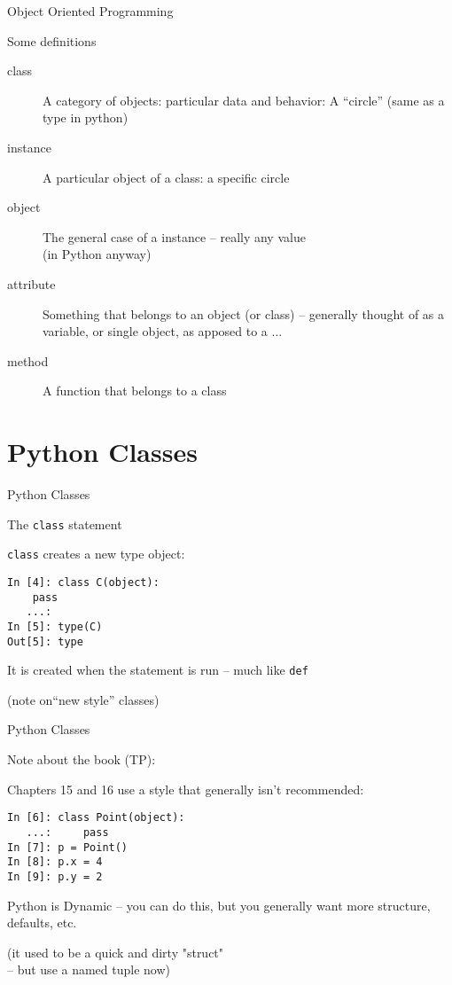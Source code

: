 \documentclass{beamer}
\begin{document}
\begin{frame}[fragile]{Object Oriented Programming}

\vfill
{\LARGE Some definitions}

\begin{description}
  \item[class] A category of objects: particular data and behavior: A ``circle'' (same as a type in python)
  \item[instance] A particular object of a class: a specific circle
  \item[object] The general case of a instance -- really any value\\ (in Python anyway)
  \item[attribute] Something that belongs to an object (or class)
    -- generally thought of as a variable, or single object, as apposed to a ...
  \item[method] A function that belongs to a class
\end{description}

\end{frame} 


\section{Python Classes}

\begin{frame}[fragile]{Python Classes}

{\Large The \verb|class| statement}

\vfill
{\large \verb|class| creates a new type object:}

\begin{verbatim}
In [4]: class C(object):
    pass
   ...: 
In [5]: type(C)
Out[5]: type
\end{verbatim}

{\large It is created when the statement is run -- much like \verb|def|}

\vfill
(note on``new style'' classes)

\end{frame} 

\begin{frame}[fragile]{Python Classes}

{\Large Note about the book (TP):}

Chapters 15 and 16 use a style that generally isn't recommended:

\begin{verbatim}
In [6]: class Point(object):
   ...:     pass
In [7]: p = Point()
In [8]: p.x = 4
In [9]: p.y = 2
\end{verbatim}

Python is Dynamic -- you can do this, but you generally want more structure,
defaults, etc. 

\vfill
(it used to be a quick and dirty "struct"\\
\hspace{0.2in} -- but use a named tuple now)
\end{frame} 
\end{document}
